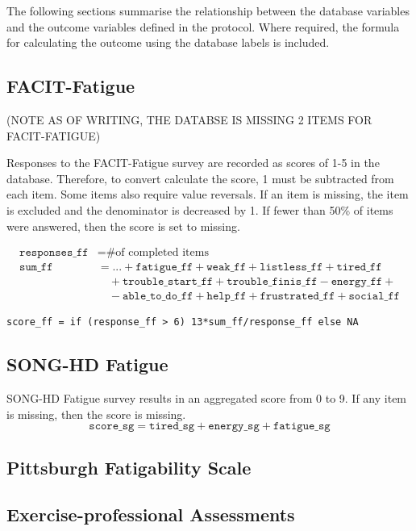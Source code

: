 \documentclass[
]{article}
\begin{document}
The following sections summarise the relationship between the database variables and the outcome variables defined in the protocol.
Where required, the formula for calculating the outcome using the database labels is included.

\subsection{FACIT-Fatigue}

(NOTE AS OF WRITING, THE DATABSE IS MISSING 2 ITEMS FOR FACIT-FATIGUE)

Responses to the FACIT-Fatigue survey are recorded as scores of 1-5 in the database.
Therefore, to convert calculate the score, 1 must be subtracted from each item.
Some items also require value reversals.
If an item is missing, the item is excluded and the denominator is decreased by 1.
If fewer than 50\% of items were answered, then the score is set to missing.

$$
\begin{aligned}
\texttt{responses\_ff} &= \text{\# of completed items}\\
\texttt{sum\_ff} &= ... + \texttt{fatigue\_ff} + \texttt{weak\_ff} + \texttt{listless\_ff} + \texttt{tired\_ff}\\
&\quad+\texttt{trouble\_start\_ff}+\texttt{trouble\_finis\_ff}-\texttt{energy\_ff}+ \\
&\quad-\texttt{able\_to\_do\_ff}+\texttt{help\_ff}+\texttt{frustrated\_ff}+\texttt{social\_ff}
\end{aligned}
$$

\begin{verbatim}
score_ff = if (response_ff > 6) 13*sum_ff/response_ff else NA
\end{verbatim}

\subsection{SONG-HD Fatigue}

SONG-HD Fatigue survey results in an aggregated score from 0 to 9.
If any item is missing, then the score is missing.
$$
\texttt{score\_sg} = \texttt{tired\_sg} + \texttt{energy\_sg} + \texttt{fatigue\_sg}
$$

\subsection{Pittsburgh Fatigability Scale}

\subsection{Exercise-professional Assessments}
\end{document}
